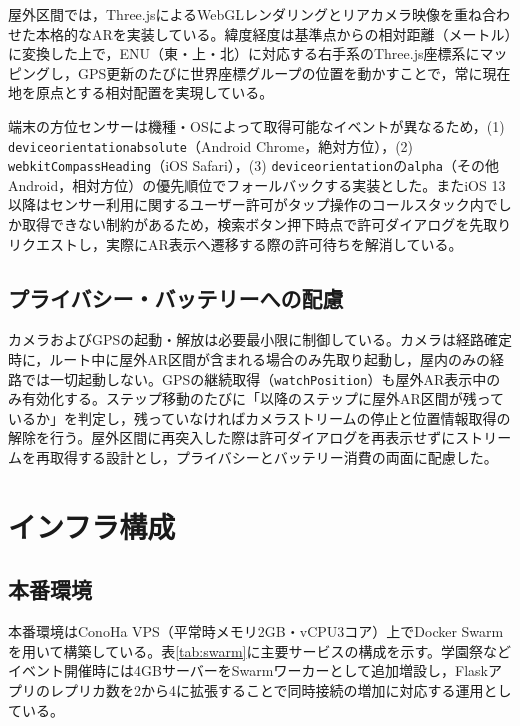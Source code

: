 \documentclass[a4paper,10.5pt]{ltjsarticle}
\begin{document}
屋外区間では，Three.jsによるWebGLレンダリングとリアカメラ映像を重ね合わせた本格的なARを実装している。緯度経度は基準点からの相対距離（メートル）に変換した上で，ENU（東・上・北）に対応する右手系のThree.js座標系にマッピングし，GPS更新のたびに世界座標グループの位置を動かすことで，常に現在地を原点とする相対配置を実現している。

端末の方位センサーは機種・OSによって取得可能なイベントが異なるため，(1) \texttt{deviceorientationabsolute}（Android Chrome，絶対方位），(2) \texttt{webkitCompassHeading}（iOS Safari），(3) \texttt{deviceorientation}の\texttt{alpha}（その他Android，相対方位）の優先順位でフォールバックする実装とした。またiOS 13以降はセンサー利用に関するユーザー許可がタップ操作のコールスタック内でしか取得できない制約があるため，検索ボタン押下時点で許可ダイアログを先取りリクエストし，実際にAR表示へ遷移する際の許可待ちを解消している。

\subsection{プライバシー・バッテリーへの配慮}

カメラおよびGPSの起動・解放は必要最小限に制御している。カメラは経路確定時に，ルート中に屋外AR区間が含まれる場合のみ先取り起動し，屋内のみの経路では一切起動しない。GPSの継続取得（\texttt{watchPosition}）も屋外AR表示中のみ有効化する。ステップ移動のたびに「以降のステップに屋外AR区間が残っているか」を判定し，残っていなければカメラストリームの停止と位置情報取得の解除を行う。屋外区間に再突入した際は許可ダイアログを再表示せずにストリームを再取得する設計とし，プライバシーとバッテリー消費の両面に配慮した。

\section{インフラ構成}
\label{sec:infra}

\subsection{本番環境}

本番環境はConoHa VPS（平常時メモリ2GB・vCPU3コア）上でDocker Swarmを用いて構築している。表\ref{tab:swarm}に主要サービスの構成を示す。学園祭などイベント開催時には4GBサーバーをSwarmワーカーとして追加増設し，Flaskアプリのレプリカ数を2から4に拡張することで同時接続の増加に対応する運用としている。
\end{document}
